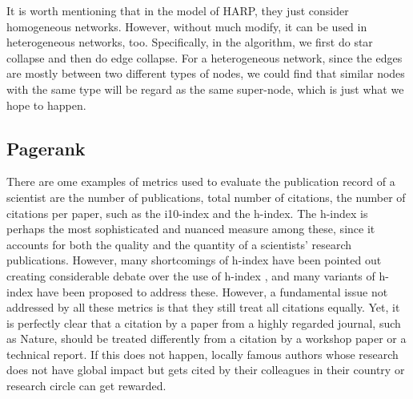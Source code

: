 \documentclass[conference]{IEEEtran}
\begin{document}
It is worth mentioning that in the model of HARP, they just consider homogeneous networks. However, without much modify, it can be used in heterogeneous networks, too. Specifically, in the algorithm, we first do star collapse and then do edge collapse. For a heterogeneous network, since the edges are mostly between two different types of nodes, we could find that similar nodes with the same type will be regard as the same super-node, which is just what we hope to happen.
\subsection{Pagerank}
There are ome examples of metrics used to evaluate the publication record of a scientist are the number of publications, total number of citations, the number of citations per paper, such as the i10-index and the h-index. The h-index is perhaps the most sophisticated and nuanced measure among these, since it accounts for both the quality and the quantity of a scientists’ research publications. However, many shortcomings of h-index have been pointed out creating considerable debate over the use of h-index \cite{costas2007h}\cite{egghe2006theory}\cite{zhivotovsky2008self}, and many variants of h-index have been proposed to address these. However, a fundamental issue not addressed by all these metrics is that they still treat all citations equally. Yet, it is perfectly clear that a citation by a paper from a highly regarded journal, such as Nature, should be treated differently from a citation by a workshop paper or a technical report. If this does not happen, locally famous authors whose research does not have global impact but gets cited by their colleagues in their country or research circle can get rewarded. 
\end{document}
